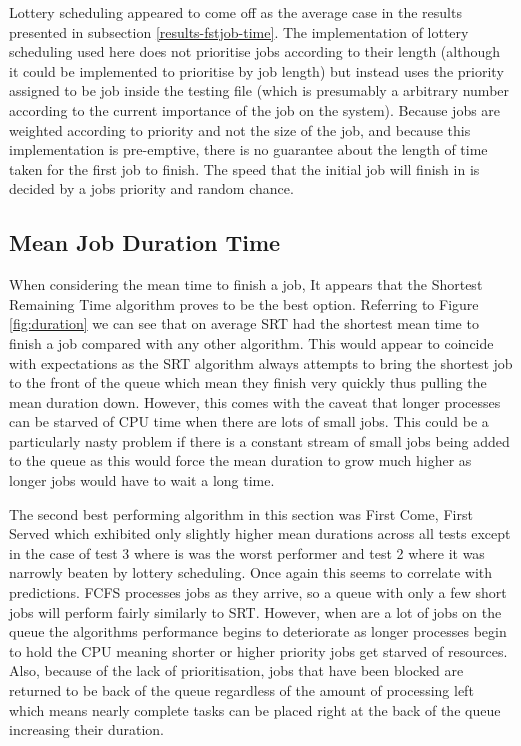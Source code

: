 \documentclass{acm_proc_article-sp}
\begin{document}
Lottery scheduling appeared to come off as the average case in the results presented in subsection \ref{results-fstjob-time}. The implementation of lottery scheduling used here does not prioritise jobs according to their length (although it could be implemented to prioritise by job length) but instead uses the priority assigned to be job inside the testing file (which is presumably a arbitrary number according to the current importance of the job on the system). Because jobs are weighted according to priority and not the size of the job, and because this implementation is pre-emptive, there is no guarantee about the length of time taken for the first job to finish. The speed that the initial job will finish in is decided by a jobs priority and random chance.

\subsection{Mean Job Duration Time}
When considering the mean time to finish a job, It appears that the Shortest Remaining Time algorithm proves to be the best option. Referring to Figure \ref{fig:duration} we can see that on average SRT had the shortest mean time to finish a job compared with any other algorithm. This would appear to coincide with expectations as the SRT algorithm always attempts to bring the shortest job to the front of the queue which mean they finish very quickly thus pulling the mean duration down. However, this comes with the caveat that longer processes can be starved of CPU time when there are lots of small jobs. This could be a particularly nasty problem if there is a constant stream of small jobs being added to the queue as this would force the mean duration to grow much higher as longer jobs would have to wait a long time.

The second best performing algorithm in this section was First Come, First Served which exhibited only slightly higher mean durations across all tests except in the case of test 3 where is was the worst performer and test 2 where it was narrowly beaten by lottery scheduling. Once again this seems to correlate with predictions. FCFS processes jobs as they arrive, so a queue with only a few short jobs will perform fairly similarly to SRT. However, when are a lot of jobs on the queue the algorithms performance begins to deteriorate as longer processes begin to hold the CPU meaning shorter or higher priority jobs get starved of resources. Also, because of the lack of prioritisation, jobs that have been blocked are returned to be back of the queue regardless of the amount of processing left which means nearly complete tasks can be placed right at the back of the queue increasing their duration.
\end{document}
